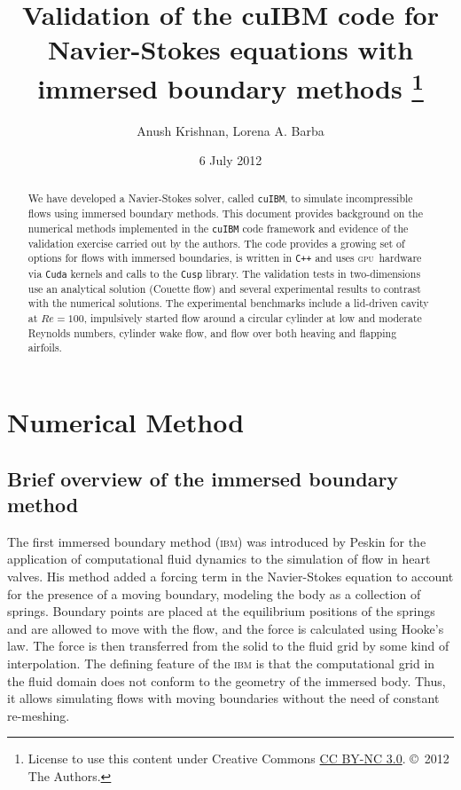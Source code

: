 \documentclass{tufte-handout}
\title[Validation of  {cuIBM}]{Validation of the {cuIBM} code for Navier-Stokes equations with immersed boundary methods \thanks{ License to use this content under Creative Commons \href{http://creativecommons.org/licenses/by-nc-sa/3.0/}{CC BY-NC 3.0}.  \copyright~2012 The Authors.}\vspace{0.5cm}}
\author[A. Krishnan, L.~A. Barba]{Anush Krishnan, Lorena A. Barba}
\date{6 July 2012}  %
\newcommand{\cuibm}{\Verb|cuIBM|\xspace}
\newcommand{\ibm}{\textsc{ibm}\xspace}
\newcommand{\gpu}{\textsc{gpu}}
\newcommand{\cuda}{\texttt{Cuda}\xspace}
\newcommand{\cusp}{\texttt{Cusp}\xspace}
\begin{document}
\maketitle

\begin{abstract}
\noindent We have developed a Navier-Stokes solver, called \cuibm, to simulate incompressible flows using  immersed boundary methods.  This document provides background on the numerical methods implemented in the \cuibm code framework and evidence of the validation exercise carried out by the authors. The code provides a growing set of options for flows with immersed boundaries, is written in \Verb|C++| and uses \gpu\ hardware via \cuda kernels and calls to the \cusp library. The validation tests in two-dimensions use an analytical solution (Couette flow) and several experimental results to contrast with the numerical solutions. The experimental benchmarks include a lid-driven cavity at $Re=100$, impulsively started flow around a circular cylinder at low and moderate Reynolds numbers, cylinder wake flow, and flow over both heaving and flapping airfoils.
\end{abstract}



\section{Numerical Method}\label{s:method}

\subsection{Brief overview of the immersed boundary method}\label{s:overview}

The first immersed boundary method (\ibm) was introduced by Peskin for the application of computational fluid dynamics to the simulation of flow in heart valves.\cite{Peskin1972}
His method added a forcing term in the Navier-Stokes equation to account for the presence of a moving boundary, modeling the body as a collection of springs. Boundary points are placed at the equilibrium positions of the springs and are allowed to move with the flow, and the force is calculated using Hooke's law. The force is then transferred from the solid to the fluid grid by some kind of interpolation. The defining feature of the \ibm  is that the computational grid in the fluid domain does not conform to the geometry of the immersed body. Thus, it allows simulating flows with moving boundaries without the need of constant re-meshing.
\end{document}
